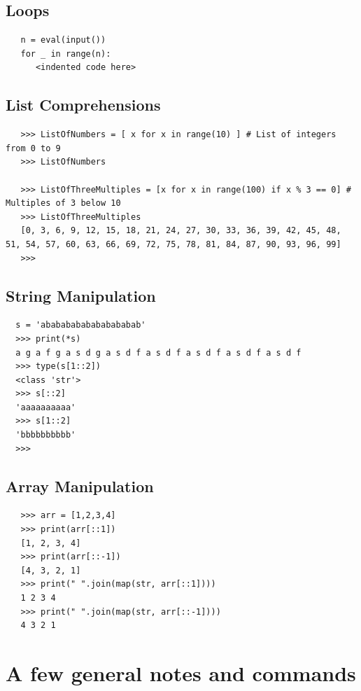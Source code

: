 \documentclass[11pt,a4paper]{article}
\begin{document}
    
    \subsection{Loops}
    \begin{lstlisting}
   n = eval(input())
   for _ in range(n):
      <indented code here>
  \end{lstlisting}


    \subsection{List Comprehensions}
    \begin{lstlisting}
   >>> ListOfNumbers = [ x for x in range(10) ] # List of integers from 0 to 9
   >>> ListOfNumbers

   >>> ListOfThreeMultiples = [x for x in range(100) if x % 3 == 0] # Multiples of 3 below 10
   >>> ListOfThreeMultiples
   [0, 3, 6, 9, 12, 15, 18, 21, 24, 27, 30, 33, 36, 39, 42, 45, 48, 51, 54, 57, 60, 63, 66, 69, 72, 75, 78, 81, 84, 87, 90, 93, 96, 99]
   >>> 
  \end{lstlisting}  


    \subsection{String Manipulation}
    \begin{lstlisting}
  s = 'abababababababababab'
  >>> print(*s)
  a g a f g a s d g a s d f a s d f a s d f a s d f a s d f
  >>> type(s[1::2])
  <class 'str'>
  >>> s[::2]
  'aaaaaaaaaa'
  >>> s[1::2]
  'bbbbbbbbbb'
  >>> 
  \end{lstlisting}  



    \subsection{Array Manipulation}
    \begin{lstlisting}
   >>> arr = [1,2,3,4]
   >>> print(arr[::1])
   [1, 2, 3, 4]
   >>> print(arr[::-1])
   [4, 3, 2, 1]
   >>> print(" ".join(map(str, arr[::1])))
   1 2 3 4
   >>> print(" ".join(map(str, arr[::-1])))
   4 3 2 1
  \end{lstlisting}  



 \newpage
\section{A few general notes and commands}
\end{document}
